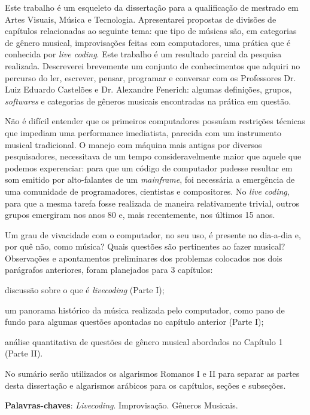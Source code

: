 \setlength{\absparsep}{18pt} %
\begin{resumo}
Este trabalho é um esqueleto da dissertação para a qualificação de mestrado em Artes Visuais, Música e Tecnologia. Apresentarei propostas de divisões de capítulos relacionadas ao seguinte tema: que tipo de músicas são, em categorias de gênero musical, improvisações feitas com computadores, uma prática que é conhecida por \textit{live coding}. Este trabalho é um resultado parcial da pesquisa realizada. Descreverei brevemente um conjunto de conhecimentos que adquiri no percurso do ler, escrever, pensar, programar e conversar com os Professores Dr. Luiz Eduardo Castelões e Dr. Alexandre Fenerich: algumas definições, grupos, \textit{softwares} e categorias de gêneros musicais encontradas na prática em questão.

Não é difícil entender que os primeiros computadores possuíam restrições técnicas que impediam uma performance imediatista, parecida com um instrumento musical tradicional. O manejo com máquina mais antigas por diversos pesquisadores, necessitava de um tempo consideravelmente maior que aquele que podemos experenciar: para que um código de computador pudesse resultar em som emitido por alto-falantes de um \emph{mainframe}, foi necessária a emergência de uma comunidade de programadores, cientistas e compositores. No \emph{live coding}, para que a mesma tarefa fosse  realizada de maneira relativamente trivial, outros grupos emergiram nos anos 80 e, mais recentemente, nos últimos 15 anos.

Um grau de vivacidade com o computador, no seu uso, é presente no dia-a-dia e, por quê não, como música? Quais questões são pertinentes ao fazer musical?  Observações e apontamentos preliminares dos problemas colocados nos dois parágrafos anteriores, foram planejados para 3 capítulos: \begin{inparaenum}
\item discussão sobre o que é \textit{livecoding} (Parte I); 
\item um panorama histórico da música realizada pelo computador, como pano de fundo para algumas questões apontadas no capítulo anterior (Parte I);
\item análise quantitativa de questões de gênero musical abordados no Capítulo 1 (Parte II).
\end{inparaenum}

No sumário serão utilizados os algarismos Romanos I e II para separar as partes desta dissertação e algarismos arábicos para os capítulos, seções e subseções.

\textbf{Palavras-chaves}: \textit{Livecoding}. Improvisação. Gêneros Musicais.
\end{resumo}

